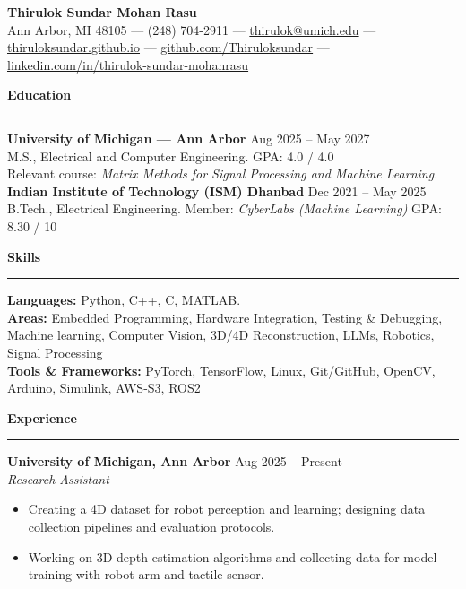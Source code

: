 \documentclass[10pt]{article}
\newcommand{\sect}[1]{\vspace{2pt}\noindent\textbf{\large #1}\vspace{1pt}\hrule\vspace{2pt}}
\begin{document}
\begin{center}
  {\Large \textbf{Thirulok Sundar Mohan Rasu}}\\[2pt]
  Ann Arbor, MI 48105 --- (248) 704-2911 --- \href{mailto:thirulok@umich.edu}{thirulok@umich.edu} ---\\
  \href{https://thiruloksundar.github.io}{thiruloksundar.github.io} --- \href{https://github.com/Thiruloksundar}{github.com/Thiruloksundar} --- \href{https://www.linkedin.com/in/thirulok-sundar-mohanrasu/}{linkedin.com/in/thirulok-sundar-mohanrasu}
\end{center}

\sect{Education}
\textbf{University of Michigan --- Ann Arbor} \hfill Aug 2025 -- May 2027\\
M.S., Electrical and Computer Engineering. \hfill GPA: 4.0 / 4.0\\
Relevant course: \emph{Matrix Methods for Signal Processing and Machine Learning.}\\[3pt]
\textbf{Indian Institute of Technology (ISM) Dhanbad} \hfill Dec 2021 -- May 2025\\
B.Tech., Electrical Engineering. Member: \emph{CyberLabs (Machine Learning)} \hfill GPA: 8.30 / 10

\sect{Skills}
\textbf{Languages:} Python, C++, C, MATLAB.\\
\textbf{Areas:} Embedded Programming, Hardware Integration, Testing \& Debugging, Machine learning, Computer Vision, 3D/4D Reconstruction, LLMs, Robotics, Signal Processing\\
\textbf{Tools \& Frameworks:} PyTorch, TensorFlow, Linux, Git/GitHub, OpenCV, Arduino, Simulink, AWS-S3, ROS2

\sect{Experience}

\textbf{University of Michigan, Ann Arbor} \hfill Aug 2025 -- Present\\
\emph{Research Assistant}
\vspace{-2mm}
\begin{itemize}[leftmargin=*,noitemsep,topsep=1pt]
  \item Creating a 4D dataset for robot perception and learning; designing data collection pipelines and evaluation protocols.
  \item Working on 3D depth estimation algorithms and collecting data for model training with robot arm and tactile sensor.
\end{itemize}
\end{document}
